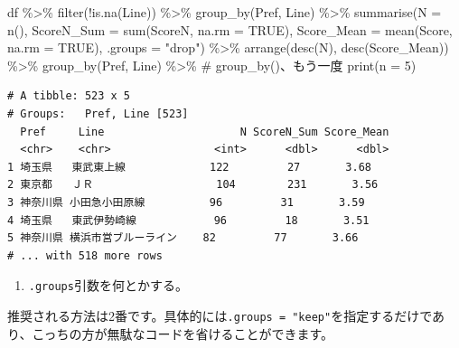 \documentclass[
  a4paper,
  pandoc,
  ja=standard,
  jafont=haranoaji]{bxjsbook}
\newenvironment{Shaded}{\begin{snugshade}}{\end{snugshade}}
\newcommand{\AttributeTok}[1]{\textcolor[rgb]{0.00,0.48,0.65}{#1}}
\newcommand{\CommentTok}[1]{\textcolor[rgb]{0.37,0.37,0.37}{#1}}
\newcommand{\ConstantTok}[1]{\textcolor[rgb]{0.56,0.35,0.01}{#1}}
\newcommand{\DecValTok}[1]{\textcolor[rgb]{0.68,0.00,0.00}{#1}}
\newcommand{\FunctionTok}[1]{\textcolor[rgb]{0.28,0.35,0.67}{#1}}
\newcommand{\NormalTok}[1]{\textcolor[rgb]{0.00,0.48,0.65}{#1}}
\newcommand{\SpecialCharTok}[1]{\textcolor[rgb]{0.37,0.37,0.37}{#1}}
\newcommand{\StringTok}[1]{\textcolor[rgb]{0.13,0.47,0.30}{#1}}
\providecommand{\tightlist}{%
  \setlength{\itemsep}{0pt}\setlength{\parskip}{0pt}}
\begin{document}
\begin{Shaded}
\begin{Highlighting}[numbers=left,,]
\NormalTok{df }\SpecialCharTok{\%\textgreater{}\%}
  \FunctionTok{filter}\NormalTok{(}\SpecialCharTok{!}\FunctionTok{is.na}\NormalTok{(Line)) }\SpecialCharTok{\%\textgreater{}\%} 
  \FunctionTok{group\_by}\NormalTok{(Pref, Line) }\SpecialCharTok{\%\textgreater{}\%} 
  \FunctionTok{summarise}\NormalTok{(}\AttributeTok{N           =} \FunctionTok{n}\NormalTok{(),}
            \AttributeTok{ScoreN\_Sum  =} \FunctionTok{sum}\NormalTok{(ScoreN,  }\AttributeTok{na.rm =} \ConstantTok{TRUE}\NormalTok{),}
            \AttributeTok{Score\_Mean  =} \FunctionTok{mean}\NormalTok{(Score,  }\AttributeTok{na.rm =} \ConstantTok{TRUE}\NormalTok{),}
            \AttributeTok{.groups     =} \StringTok{"drop"}\NormalTok{) }\SpecialCharTok{\%\textgreater{}\%}
  \FunctionTok{arrange}\NormalTok{(}\FunctionTok{desc}\NormalTok{(N), }\FunctionTok{desc}\NormalTok{(Score\_Mean)) }\SpecialCharTok{\%\textgreater{}\%}
  \FunctionTok{group\_by}\NormalTok{(Pref, Line) }\SpecialCharTok{\%\textgreater{}\%} \CommentTok{\# group\_by()、もう一度}
  \FunctionTok{print}\NormalTok{(}\AttributeTok{n =} \DecValTok{5}\NormalTok{)}
\end{Highlighting}
\end{Shaded}

\begin{verbatim}
# A tibble: 523 x 5
# Groups:   Pref, Line [523]
  Pref     Line                     N ScoreN_Sum Score_Mean
  <chr>    <chr>                <int>      <dbl>      <dbl>
1 埼玉県   東武東上線             122         27       3.68
2 東京都   ＪＲ                   104        231       3.56
3 神奈川県 小田急小田原線          96         31       3.59
4 埼玉県   東武伊勢崎線            96         18       3.51
5 神奈川県 横浜市営ブルーライン    82         77       3.66
# ... with 518 more rows
\end{verbatim}

\begin{enumerate}
\def\labelenumi{\arabic{enumi}.}
\setcounter{enumi}{1}
\tightlist
\item
  \texttt{.groups}引数を何とかする。
\end{enumerate}

推奨される方法は2番です。具体的には\texttt{.groups\ =\ "keep"}を指定するだけであり、こっちの方が無駄なコードを省けることができます。
\end{document}
